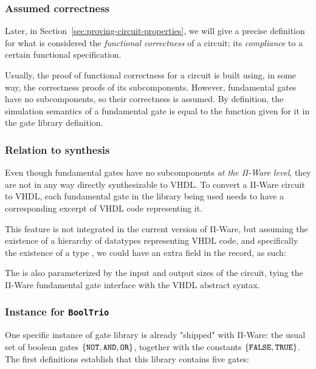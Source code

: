             \subsubsection{Assumed correctness}
            Later, in Section~\ref{sec:proving-circuit-properties}, we will give a precise definition
            for what is considered the \emph{functional correctness} of a circuit; its \emph{compliance}
            to a certain functional specification.

            Usually, the proof of functional correctness for a circuit is built using, in some way,
            the correctness proofs of its subcomponents.
            However, fundamental gates have no subcomponents, so their correctness is assumed.
            By definition, the simulation semantics of a fundamental gate is equal to the 
            function given for it in the gate library definition.

            \subsubsection{Relation to synthesis}
            \label{subsubsec:relation-to-synthesis}
            Even though fundamental gates have no subcomponents \emph{at the Π-Ware level},
            they are not in any way directly synthesizable to \ac{VHDL}.
            To convert a Π-Ware circuit to \ac{VHDL}, each fundamental gate in the library being used
            needs to have a corresponding excerpt of \ac{VHDL} code representing it.

            This feature is not integrated in the current version of Π-Ware, but assuming the existence
            of a hierarchy of datatypes representing \ac{VHDL} code, and specifically the existence
            of a type , we could have an extra field in the  record, as such:

            \begin{center}
                \AY{:} \AY{(} \AY{:}  \AY{(} \AY{)}\AY{)}   \AY{(} \AY{)} \AY{(} \AY{)}
            \end{center}

            The  is also parameterized by the input and output sizes of the circuit,
            tying the Π-Ware fundamental gate interface with the \ac{VHDL} abstract syntax.

            \subsubsection{Instance for \texttt{BoolTrio}}
            One specific instance of gate library is already "shipped" with Π-Ware:
            the usual set of boolean gates
            $\{ \text{\texttt{NOT}}, \text{\texttt{AND}}, \text{\texttt{OR}} \}$, together with
            the constants $\{ \text{\texttt{FALSE}}, \text{\texttt{TRUE}} \}$.
            The first definitions establish that this library contains five gates:

